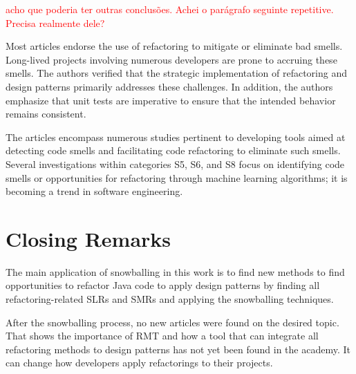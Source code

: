\textcolor{red}{acho que poderia ter outras conclusões. Achei o parágrafo seguinte repetitive. Precisa realmente dele?}

Most articles endorse the use of refactoring to mitigate or eliminate bad smells. Long-lived projects involving numerous developers are prone to accruing these smells. The authors verified that the strategic implementation of refactoring and design patterns primarily addresses these challenges. In addition, the authors emphasize that unit tests are imperative to ensure that the intended behavior remains consistent.

The articles encompass numerous studies pertinent to developing tools aimed at detecting code smells and facilitating code refactoring to eliminate such smells. Several investigations within categories S5, S6, and S8 focus on identifying code smells or opportunities for refactoring through machine learning algorithms; it is becoming a trend in software engineering.

\section{Closing Remarks}
\label{sec-cloasing-remarks}

The main application of snowballing in this work is to find new methods to find opportunities to refactor Java code to apply design patterns by finding all refactoring-related SLRs and SMRs and applying the snowballing techniques. 

After the snowballing process, no new articles were found on the desired topic. That shows the importance of RMT and how a tool that can integrate all refactoring methods to design patterns has not yet been found in the academy. It can change how developers apply refactorings to their projects.